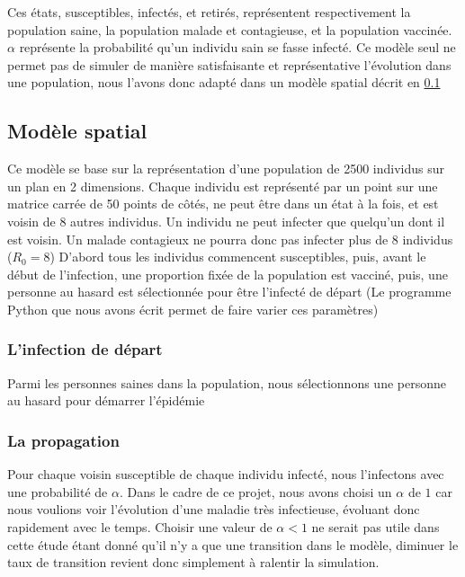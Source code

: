 \documentclass[journal, a4paper]{IEEEtran}
\begin{document}
	Ces états, susceptibles, infectés, et retirés, représentent respectivement la population saine, la population malade et contagieuse, et la population vaccinée. $\alpha$ représente la probabilité qu'un individu sain se fasse infecté.
	Ce modèle seul ne permet pas de simuler de manière satisfaisante et représentative l'évolution dans une population, nous l'avons donc adapté dans un modèle spatial décrit en \ref{sec:modele_spatial}

	\subsection{Modèle spatial}
	\label{sec:modele_spatial}
	Ce modèle se base sur la représentation d'une population de 2500 individus sur un plan en 2 dimensions. Chaque individu est représenté par un point sur une matrice carrée de 50 points de côtés, ne peut être dans un état à la fois, et est voisin de 8 autres individus. Un individu ne peut infecter que quelqu'un dont il est voisin. Un malade contagieux ne pourra donc pas infecter plus de 8 individus ($R_0 = 8$)
	D'abord tous les individus commencent susceptibles, puis, avant le début de l'infection, une proportion fixée de la population est vacciné, puis, une personne au hasard est sélectionnée pour être l'infecté de départ (Le programme Python que nous avons écrit permet de faire varier ces paramètres)
	\subsubsection{L'infection de départ}
	Parmi les personnes saines dans la population, nous sélectionnons une personne au hasard pour démarrer l'épidémie
	\subsubsection{La propagation}
	Pour chaque voisin susceptible de chaque individu infecté, nous l'infectons avec une probabilité de $\alpha$. Dans le cadre de ce projet, nous avons choisi un $\alpha$ de $1$ car nous voulions voir l'évolution d'une maladie très infectieuse, évoluant donc rapidement avec le temps. Choisir une valeur de $\alpha < 1$ ne serait pas utile dans cette étude étant donné qu'il n'y a que une transition dans le modèle, diminuer le taux de transition revient donc simplement à ralentir la simulation.
\end{document}
